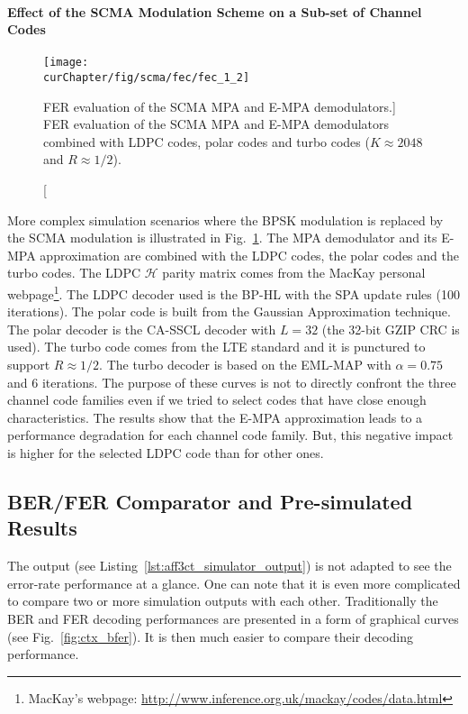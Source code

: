 \paragraph{Effect of the SCMA Modulation Scheme on a Sub-set of Channel Codes}

\begin{figure}[htp]
  \centering
  \texttt{[image: \\curChapter/fig/scma/fec/fec\_1\_2]}
  \caption
    [FER evaluation of the SCMA MPA and E-MPA demodulators.]
    {FER evaluation of the SCMA MPA and E-MPA demodulators combined with LDPC
     codes, polar codes and turbo codes ($K \approx 2048$ and $R \approx 1/2$).}
  \label{plot:aff3ct_scma_fec}
\end{figure}

More complex simulation scenarios where the BPSK modulation is replaced by the
SCMA modulation is illustrated in Fig.~\ref{plot:aff3ct_scma_fec}. The MPA
demodulator and its E-MPA approximation are combined with the LDPC codes, the
polar codes and the turbo codes. The LDPC $\mathcal{H}$ parity matrix comes from
the MacKay personal webpage\footnote{MacKay's webpage:
\url{http://www.inference.org.uk/mackay/codes/data.html}}. The LDPC decoder used
is the BP-HL with the SPA update rules (100 iterations). The polar code is built
from the Gaussian Approximation technique. The polar decoder is the CA-SSCL
decoder with $L=32$ (the 32-bit GZIP CRC is used). The turbo code comes from the
LTE standard and it is punctured to support $R \approx 1/2$. The turbo decoder
is based on the EML-MAP with $\alpha = 0.75$ and 6 iterations. The purpose of
these curves is not to directly confront the three channel code families even if
we tried to select codes that have close enough characteristics. The results
show that the E-MPA approximation leads to a performance degradation for each
channel code family. But, this negative impact is higher for the selected LDPC
code than for other ones.

\subsection{BER/FER Comparator and Pre-simulated Results}

The \AFFECT output (see Listing~\ref{lst:aff3ct_simulator_output}) is not
adapted to see the error-rate performance at a glance. One can note that it is
even more complicated to compare two or more simulation outputs with each other.
Traditionally the BER and FER decoding performances are presented in a form of
graphical curves (see Fig.~\ref{fig:ctx_bfer}). It is then much easier to
compare their decoding performance.

